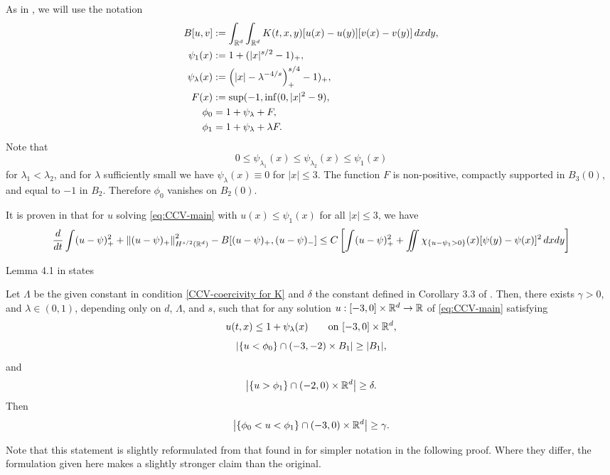 As in \cite{CaChVa.nio}, we will use the notation
\begin{align*}
B[u,v] &:= \int_{\mathbb{R}^d} \int_{\mathbb{R}^d} K(t,x,y) [u(x)-u(y)] [v(x)-v(y)] \,dxdy, \\
\psi_1(x) &:= 1 + (|x|^{s/2} - 1)_+, \\
\psi_\lambda(x) &:= \left( |x| - \lambda^{-4/s}  \right)_+^{s/4} - 1)_+, \\
F(x) &:= \sup(-1, \inf(0, |x|^2 - 9), \\
\phi_0 &= 1 + \psi_\lambda + F, \\
\phi_1 &= 1 + \psi_\lambda + \lambda F.
\end{align*}
Note that 
\[ 0 \leq \psi_{\lambda_1}(x) \leq \psi_{\lambda_2}(x) \leq \psi_1(x) \]
for $\lambda_1 < \lambda_2$, and for $\lambda$ sufficiently small we have $\psi_\lambda(x) \equiv 0$ for $|x| \leq 3$.  The function $F$ is non-positive, compactly supported in $B_3(0)$, and equal to $-1$ in $B_2$.  Therefore $\phi_0$ vanishes on $B_2(0)$.  

It is proven in \cite{CaChVa.nio} that for $u$ solving \eqref{eq:CCV-main} with $u(x) \leq \psi_1(x)$ for all $|x|\leq 3$, we have
\begin{equation} \label{CCV-energy inequality generic}
\frac{d}{dt} \int (u - \psi)_+^2 + \left\lVert(u-\psi)_+\right\rVert^2_{H^{s/2}(\mathbb{R}^d)} - B[(u-\psi)_+,(u-\psi)_-] \leq C \left[ \int (u-\psi)_+^2 + \iint \chi_{\{u-\psi_1 > 0\}}(x)[\psi(y)-\psi(x)]^2 \,dxdy  \right]
\end{equation}



Lemma 4.1 in \cite{CaChVa.nio} states
\begin{lemma}
Let $\Lambda$ be the given constant in condition \eqref{CCV-coercivity for K} and $\delta$ the constant defined in Corollary 3.3 of \cite{CaChVa.nio}.  Then, there exists $\gamma > 0$, and $\lambda \in (0,1)$, depending only on $d$, $\Lambda$, and $s$, such that for any solution $u:[-3,0] \times \mathbb{R}^d \to \mathbb{R}$ of \eqref{eq:CCV-main} satisfying
\begin{equation} \label{CCV-pointwise bound}
u(t,x) \leq 1 + \psi_\lambda(x) \qquad \textrm{on } [-3,0]\times\mathbb{R}^d, 
\end{equation}
\[ \left\lvert \{u < \phi_0\} \cap (-3,-2)\times B_1 \right\rvert \geq |B_1|, \]
and
\[ \left\lvert \{u > \phi_1\} \cap (-2,0)\times \mathbb{R}^d \right\rvert \geq \delta. \]
Then
\[ \left\lvert \{\phi_0 < u < \phi_1\} \cap (-3,0)\times \mathbb{R}^d \right\rvert \geq \gamma. \]
\end{lemma}
Note that this statement is slightly reformulated from that found in \cite{CaChVa.nio} for simpler notation in the following proof.  Where they differ, the formulation given here makes a slightly stronger claim than the original.  

